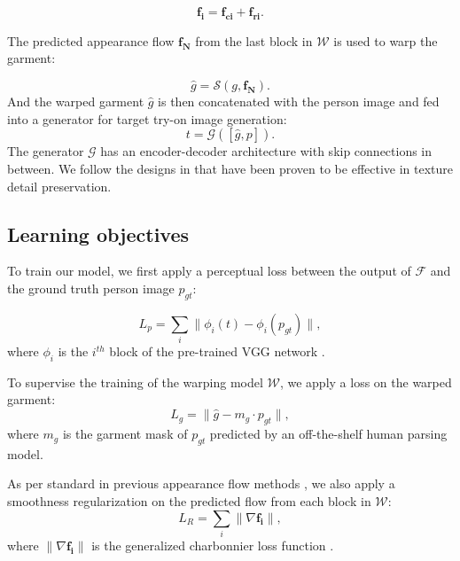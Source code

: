 \documentclass[10pt,twocolumn,letterpaper]{article}
\begin{document}
\begin{equation}\label{eq:4}
    \mathbf{f_{i}} = \mathbf{f_{ci}} + \mathbf{f_{ri}}.
\end{equation}

The predicted appearance flow $\mathbf{f_{N}}$ from the last block in $\mathcal{W}$ is used to warp the garment:

\begin{equation}
    \hat{g} = \mathcal{S}(g, \mathbf{f_{N}}).
\end{equation}
And the warped garment $\hat{g}$ is then concatenated with the person image and fed into a generator for target try-on image generation:
\begin{equation}
    t = \mathcal{G}([\hat{g}, p]).
\end{equation}
The generator $\mathcal{G}$ has an encoder-decoder architecture with skip connections in between. We follow the designs in \cite{isola2017image,zhu2017unpaired} that have been proven to be effective in texture detail preservation.

\subsection{Learning objectives}

To train our model, we first apply a perceptual loss \cite{johnson2016perceptual} between the output of $\mathcal{F}$ and the ground truth person image $p_{gt}$:

\begin{equation}
    L_{p} = \sum_{i} \lVert \phi_{i}(t) - \phi_{i}(p_{gt}) \rVert,
\end{equation}
where $\phi_{i}$ is the $i^{th}$ block of the pre-trained VGG network \cite{simonyan2014very}.

To supervise the training of the warping model $\mathcal{W}$, we apply a loss on the warped garment:
\begin{equation}
    L_{g} = \lVert \hat{g} - m_{g} \cdot p_{gt}\rVert,
\end{equation}
where $m_{g}$ is the garment mask of $p_{gt}$ predicted by an off-the-shelf human parsing model.

As per standard in previous appearance flow methods \cite{ge2021parser,han2019clothflow}, we also apply a smoothness regularization on the predicted flow from each block in $\mathcal{W}$:
\begin{equation}
    L_{R} = \sum_{i} \lVert \nabla \mathbf{f_{i}} \rVert,
\end{equation}
where $\lVert \nabla \mathbf{f_{i}} \rVert$ is the generalized charbonnier loss function \cite{sun2014quantitative}.
\end{document}
